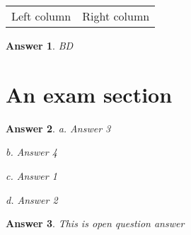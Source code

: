 \documentclass[12pt,a4paper,notitlepage]{article}
\newtheorem{answer}{Answer}
\begin{document}
    \begin{tabular}{*{2}{>{\centering\let\newline\\\arraybackslash\hspace{0pt} }m{}}}
        Left column & Right column
    \end{tabular}



    \begin{answer}
        BD
    \end{answer}

    \section{{An exam section}}



    \begin{answer}
        a. Answer 3

    b. Answer 4

    c. Answer 1

    d. Answer 2


    \end{answer}

    \begin{answer}
        This is open question answer
    \end{answer}
\end{document}
